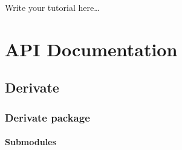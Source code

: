 \documentclass[a4paper,10pt,english]{sphinxmanual}
\begin{document}
\sphinxAtStartPar
Write your tutorial here…


\chapter{API Documentation}
\label{\detokenize{doc:api-documentation}}\label{\detokenize{doc::doc}}

\section{Derivate}
\label{\detokenize{api/modules:derivate}}\label{\detokenize{api/modules::doc}}

\subsection{Derivate package}
\label{\detokenize{api/Derivate:derivate-package}}\label{\detokenize{api/Derivate::doc}}

\subsubsection{Submodules}
\label{\detokenize{api/Derivate:module-Derivate.session1_exercise3}}\label{\detokenize{api/Derivate:submodules}}
\end{document}

